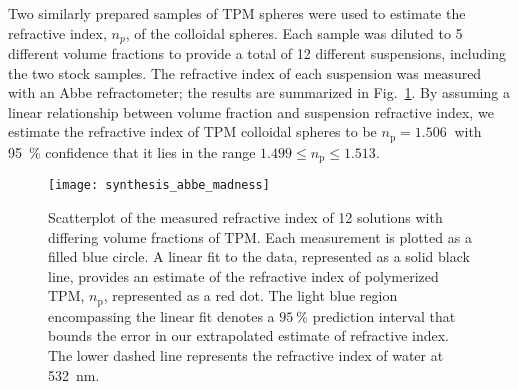 Two similarly prepared samples of TPM spheres were used to estimate the refractive
index, $n_p$, of the colloidal spheres.
Each sample was diluted to \num{5} different volume fractions to provide a total of
\num{12} different suspensions, including the two stock samples.
The refractive index of each
suspension was measured with an Abbe refractometer;
the results are summarized in Fig.~\ref{fig:abbe}.
By assuming a linear relationship between volume fraction and suspension refractive
index, we estimate the refractive index of TPM colloidal spheres to be $n_{\text{p}} = \SI{1.506}{}$ with \SI{95}{\percent} confidence that it lies in the range $1.499 \le n_{\text{p}} \le 1.513$.

\begin{figure}
    \centering
    \texttt{[image: synthesis\_abbe\_madness]}
    \caption{Scatterplot of the measured refractive index of \num{12} solutions
      with differing volume fractions of TPM. Each measurement is plotted as a filled
      blue circle.
      A linear fit to the data, represented as a solid black line, provides an estimate of
      the refractive index of polymerized TPM, $n_{\text{p}}$, represented as a red dot.
      The light blue region encompassing the linear fit denotes a $\SI{95}{\percent}$
      prediction interval that bounds the error in our extrapolated estimate of refractive
      index.
      The lower dashed line represents the refractive index of water at \SI{532}{\nm}.}
    \label{fig:abbe}
\end{figure}


